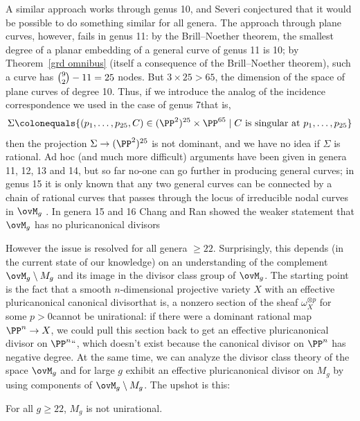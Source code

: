 A similar approach works through genus 10, and Severi conjectured that
%
it would be possible to do something similar for all genera. The
approach through plane curves, however, fails in genus 11: by the 
Brill--Noether theorem,
%
the smallest degree of a planar embedding of a general curve of genus 
11 is 10; by Theorem~\ref{grd omnibus} (itself a consequence of
the Brill--Noether theorem), such a curve has $\tbinom{9}{2}-11 = 25$
nodes. But $3 \times 25 > 65$, the dimension of the space of plane
curves of degree 10. Thus, if we introduce the analog of the 
incidence correspondence
%
we used in the case of genus 7\emdash that is,
$$
\Sigma \colonequals  \{ (p_1,\dots,p_{25},C) \in (\PP^2)^{25} \times \PP^{65} \mid C \text{ is singular at } p_1,\dots,p_{25} \}
$$
then the projection $\Sigma \to (\PP^2)^{25}$ is not dominant, and we have no idea if $\Sigma$ is rational.
Ad hoc (and much more difficult) arguments have been given in genera
11, 12, 13 and 14, but so far no-one can go further in producing
general curves; in genus 15 it is only known that
 any two general curves can be connected by a chain of rational curves that passes through
the locus of irreducible nodal curves in $\ovM_{g}$
\cite{MR2202246}. In genera 15 and 16 Chang and Ran showed 
the  weaker statement
that $\ovM_{g}$ has no pluricanonical divisors
{\meshing\par}

However the issue is resolved for all genera $\geq 22$. Surprisingly, this depends (in the current state of our knowledge) on an understanding of the complement
$\ovM_{g}\setminus M_{g}$ and its image in the divisor class group of
$\ovM_{g}$. The starting point is the fact that a smooth
$n$-dimensional projective variety $X$ with an effective
pluricanonical canonical divisor\emdash that is, a nonzero section of
the sheaf $\omega_{X}^{\otimes p}$ for some $p>0$\emdash cannot be
unirational: if there were a 
dominant rational map
%
$\PP^n \to X$, we
could pull this section back to get an effective pluricanonical
divisor on $\PP^n` `$, which doesn't exist because
the canonical divisor on $\PP^{n}$ has negative degree. At the same
time, we can analyze the divisor class theory of the space $\ovM_g$
and for large $g$ exhibit an effective pluricanonical divisor on $M_g$
by using components of  $\ovM_{g}\setminus M_{g}$.
The upshot is this:

\begin{npt}
\begin{theorem}
For all $g \geq 22$, $M_g$ is not unirational.
\end{theorem}
\end{npt}

